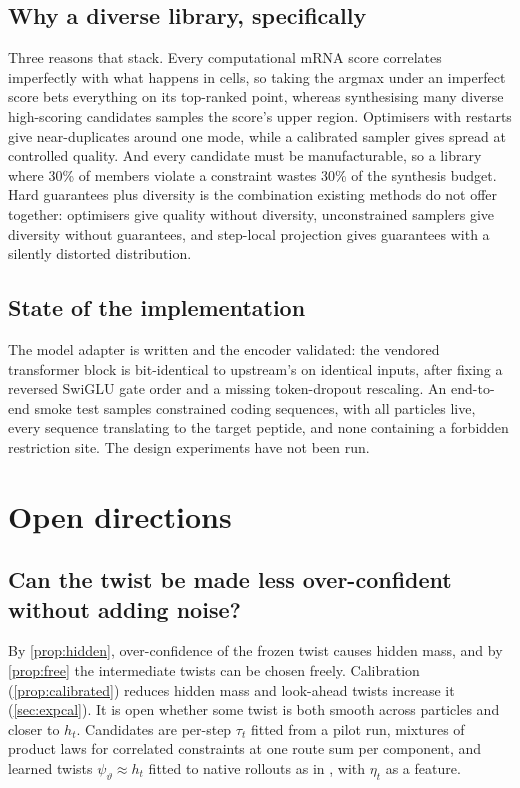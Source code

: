 \documentclass[11pt]{article}
\theoremstyle{definition}
\begin{document}
\subsection{Why a diverse library, specifically}
Three reasons that stack. Every computational mRNA score correlates imperfectly with what happens in cells, so
taking the argmax under an imperfect score bets everything on its top-ranked point, whereas synthesising many
diverse high-scoring candidates samples the score's upper region. Optimisers with restarts give near-duplicates
around one mode, while a calibrated sampler gives spread at controlled quality. And every candidate must be
manufacturable, so a library where 30\% of members violate a constraint wastes 30\% of the synthesis budget. Hard
guarantees plus diversity is the combination existing methods do not offer together: optimisers give quality
without diversity, unconstrained samplers give diversity without guarantees, and step-local projection gives
guarantees with a silently distorted distribution.

\subsection{State of the implementation}
The model adapter is written and the encoder validated: the vendored transformer block is bit-identical to
upstream's on identical inputs, after fixing a reversed SwiGLU gate order and a missing token-dropout rescaling.
An end-to-end smoke test samples constrained coding sequences, with all particles live, every sequence translating
to the target peptide, and none containing a forbidden restriction site. The design experiments have not been run.

\section{Open directions}\label{sec:open}

\subsection{Can the twist be made less over-confident without adding noise?}
By \cref{prop:hidden}, over-confidence of the frozen twist causes hidden mass, and by \cref{prop:free} the
intermediate twists can be chosen freely. Calibration (\cref{prop:calibrated}) reduces hidden mass and look-ahead
twists increase it (\cref{sec:expcal}). It is open whether some twist is both smooth across particles and closer
to $h_t$. Candidates are per-step $\tau_t$ fitted from a pilot run, mixtures of product laws for correlated
constraints at one route sum per component, and learned twists $\psi_\vartheta\approx h_t$ fitted to native
rollouts as in \cite{zhao2024}, with $\eta_t$ as a feature.
\end{document}
